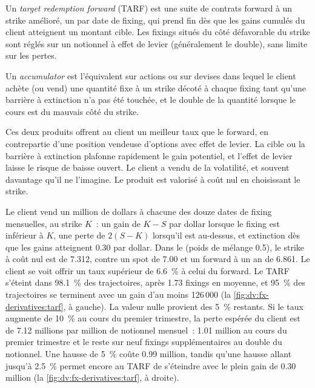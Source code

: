\begin{definition}\label{def:dv:fx-derivatives:tarf}
Un \emph{target redemption forward} (TARF) est une suite de contrats forward à un strike amélioré, un
par date de fixing, qui prend fin dès que les gains cumulés du client atteignent un montant cible. Les fixings situés du côté défavorable du strike sont
réglés sur un notionnel à effet de levier (généralement le double), sans limite sur les pertes.
\end{definition}

\begin{definition}[Accumulator]\label{def:dv:fx-derivatives:accumulator}
Un \emph{accumulator} est l'équivalent sur actions ou sur devises dans lequel le client achète (ou vend) une quantité fixe à un
strike décoté à chaque fixing tant qu'une barrière à extinction n'a pas été touchée, et le double de la quantité lorsque le cours est du mauvais
côté du strike.
\end{definition}

Ces deux produits offrent au client un meilleur taux que le forward, en contrepartie d'une position vendeuse d'options avec effet de levier. La cible ou la barrière à extinction
plafonne rapidement le gain potentiel, et l'effet de levier laisse le risque de baisse ouvert. Le client a vendu de la volatilité, et souvent davantage qu'il ne l'imagine.
Le produit est valorisé à coût nul en choisissant le strike.

\begin{example}\label{ex:dv:fx-derivatives:tarf}
Le client vend un million de dollars à chacune des douze dates de fixing mensuelles, au strike $K$~: un gain de $K-S$ par dollar lorsque le fixing est inférieur à
$K$, une perte de $2(S-K)$ lorsqu'il est au-dessus, et extinction dès que les gains atteignent 0.30 par dollar. Dans le  (poids de mélange 0.5), le
strike à coût nul est de 7.312, contre un spot de 7.00 et un forward à un an de 6.861. Le client se voit offrir un taux supérieur de 6.6~\% à celui du
forward. Le TARF s'éteint dans 98.1~\% des trajectoires, après 1.73 fixings en moyenne, et 95~\% des trajectoires se terminent avec un gain d'au moins 126\,000
(la \cref{fig:dv:fx-derivatives:tarf}, à gauche). La valeur nulle provient des 5~\% restants. Si le taux augmente de 10~\% au cours du premier trimestre, la
perte espérée du client est de 7.12 millions par million de notionnel mensuel~: 1.01 million au cours du premier trimestre et le reste sur neuf
fixings supplémentaires au double du notionnel. Une hausse de 5~\% coûte 0.99 million, tandis qu'une hausse allant jusqu'à 2.5~\% permet encore au TARF de s'éteindre avec le
plein gain de 0.30 million (la \cref{fig:dv:fx-derivatives:tarf}, à droite).
\end{example}

